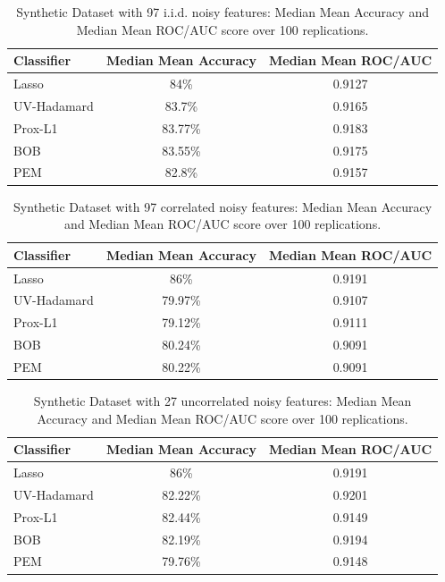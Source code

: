 \documentclass[11pt, twoside]{report}
\begin{document}
\begin{table}[h!]
    \centering
    \begin{tabular}{l c c}
        \hline
        \textbf{Classifier} & \textbf{Median Mean Accuracy} & \textbf{Median Mean ROC/AUC} \\
        \hline
        Lasso & 84\%  & 0.9127  \\
        UV-Hadamard & 83.7\%  & 0.9165  \\
        Prox-L1       & 83.77\%  & 0.9183  \\
        BOB                 & 83.55\%  & 0.9175  \\
        PEM      & 82.8\%  & 0.9157  \\
        \hline
    \end{tabular}
    \caption{Synthetic Dataset with 97 i.i.d. noisy features: Median Mean Accuracy and Median Mean ROC/AUC score over 100 replications.}
    \label{tab:train_test_accuracy_binary}
\end{table}

\begin{table}[h!]
    \centering
    \begin{tabular}{l c c}
        \hline
        \textbf{Classifier} & \textbf{Median Mean Accuracy} & \textbf{Median Mean ROC/AUC} \\
        \hline
        Lasso & 86\%  & 0.9191  \\
        UV-Hadamard & 79.97\%  & 0.9107  \\
        Prox-L1       & 79.12\%  & 0.9111  \\
        BOB                 & 80.24\%  & 0.9091  \\
        PEM      & 80.22\%  & 0.9091  \\
        \hline
    \end{tabular}
    \caption{Synthetic Dataset with 97 correlated noisy features: Median Mean Accuracy and Median Mean ROC/AUC score over 100 replications.}
    \label{tab:train_test_accuracy_binary_corr}
\end{table}

\begin{table}[h!]
    \centering
    \begin{tabular}{l c c}
        \hline
        \textbf{Classifier} & \textbf{Median Mean Accuracy} & \textbf{Median Mean ROC/AUC} \\
        \hline
        Lasso & 86\%  & 0.9191  \\
        UV-Hadamard & 82.22\%  & 0.9201  \\
        Prox-L1       & 82.44\%  & 0.9149  \\
        BOB                 & 82.19\%  & 0.9194  \\
        PEM      & 79.76\%  & 0.9148  \\
        \hline
    \end{tabular}
    \caption{Synthetic Dataset with 27 uncorrelated noisy features: Median Mean Accuracy and Median Mean ROC/AUC score over 100 replications.}
    \label{tab:train_test_accuracy_binary_small_uncorr}
\end{table}
\end{document}
